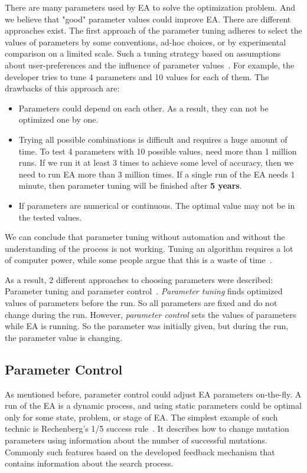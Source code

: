 There are many parameters used by EA to solve the optimization problem. And we believe that "good" parameter values could improve EA. There are different approaches exist. 
The first approach of the parameter tuning adheres to select the values of parameters by some conventions, ad-hoc choices, or by experimental comparison on a limited scale. Such a tuning strategy based on assumptions about user-preferences and the influence of parameter values~\cite{eiben03,eiben11}. For example, the developer tries to tune 4 parameters and 10 values for each of them.
The drawbacks of this approach are:
\begin{itemize}
	\item Parameters could depend on each other. As a result, they can not be optimized one by one.
	\item Trying all possible combinations is difficult and requires a huge amount of time. To test 4 parameters with 10 possible values, need more than 1 million runs. If we run it at least 3 times to achieve some level of accuracy, then we need to run EA more than 3 million times. If a single run of the EA needs 1 minute, then parameter tuning will be finished after \textbf{5 years}. 
	\item If parameters are numerical or continuous. The optimal value may not be in the tested values.
\end{itemize}

We can conclude that parameter tuning without automation and without the understanding of the process is not working. Tuning an algorithm requires a lot of computer power,
while some people argue that this is a waste of time~\cite{smit2009comparing}.

As a result, 2 different approaches to choosing parameters were described: Parameter tuning and parameter control~\cite{smit2012parameter,eiben03}.
\textit{Parameter tuning} finds optimized values of parameters before the run. So all parameters are fixed and do not change during the run. However, \textit{parameter control} sets the values of parameters while EA is running. So the parameter was initially given, but during the run, the parameter value is changing. 

\subsection{Parameter Control}
As mentioned before, parameter control could adjust EA parameters on-the-fly. A run of the EA is a dynamic process, and using static parameters could be optimal only for some state, problem, or stage of EA. 
The simplest example of such technic is Rechenberg's 1/5 success rule~\cite{rechenberg1973evolutionsstrategie}. It describes how to change mutation parameters using information about the number of successful mutations. Commonly such features based on the developed feedback mechanism that contains information about the search process.

